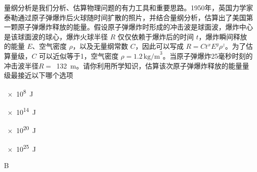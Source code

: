 量纲分析是我们分析、估算物理问题的有力工具和重要思路。1950年，英国力学家泰勒通过原子弹爆炸后火球随时间扩散的照片，并结合量纲分析，估算出了美国第一颗原子弹爆炸释放的能量。假设原子弹爆炸时形成的冲击波是球面波，爆炸中心是该球面波的球心，爆炸火球半径 \(R\) 仅仅依赖于爆炸后的时间 \(t\)，爆炸瞬间释放的能量 \(E\)、空气密度 \(\rho\)，以及无量纲常数 \(C\)，因此可以写成 \(R = C t^x E^y \rho^z\)。为了估算量级，\(C\) 可以近似等于1，空气密度 \(\rho = 1.2 \, \text{kg/m}^3\)。当原子弹爆炸25毫秒时刻的冲击波半径\(R =\) \,\qty{132}{m}。请你利用所学知识，估算该次原子弹爆炸释放的能量量级最接近以下哪个选项
\begin{choices}
	\item \qty{e8}{J}
	\item \qty{e14}{J}
	\item \qty{e20}{J}
	\item \qty{e25}{J}
\end{choices}
\begin{answer}
    B
\end{answer}